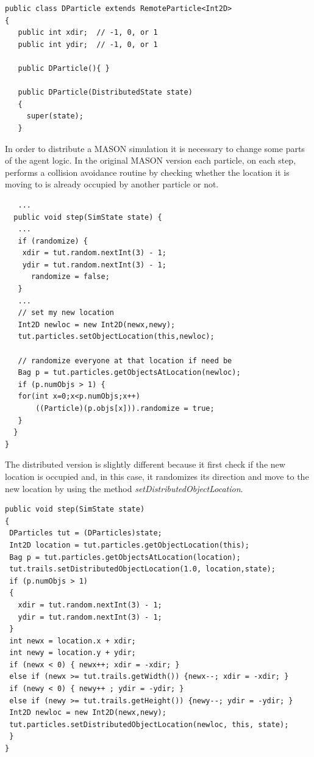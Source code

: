 \documentclass[12pt]{article}
\begin{document}
\begin{lstlisting}
public class DParticle extends RemoteParticle<Int2D>
{
   public int xdir;  // -1, 0, or 1
   public int ydir;  // -1, 0, or 1

   public DParticle(){ }
   
   public DParticle(DistributedState state)
   {
     super(state);
   }
\end{lstlisting}

In order to distribute a MASON simulation it is necessary to change some parts of the agent logic. In the original MASON version each particle, on each step, performs a collision avoidance routine by checking whether the location it is moving to is already occupied by another particle or not. 

\begin{lstlisting}
   ...
  public void step(SimState state) {
   ...
   if (randomize) {
    xdir = tut.random.nextInt(3) - 1;
    ydir = tut.random.nextInt(3) - 1;
	  randomize = false;
   }
   ...
   // set my new location
   Int2D newloc = new Int2D(newx,newy);
   tut.particles.setObjectLocation(this,newloc);
   
   // randomize everyone at that location if need be
   Bag p = tut.particles.getObjectsAtLocation(newloc);
   if (p.numObjs > 1) {
   for(int x=0;x<p.numObjs;x++)
       ((Particle)(p.objs[x])).randomize = true;
   }
  }
}
\end{lstlisting}

The distributed version is slightly different because it first check if the new location is occupied and, in this case, it randomizes its direction and move to the new location by using the method \textit{setDistributedObjectLocation}.


\begin{lstlisting}
public void step(SimState state)
{
 DParticles tut = (DParticles)state;
 Int2D location = tut.particles.getObjectLocation(this);
 Bag p = tut.particles.getObjectsAtLocation(location);
 tut.trails.setDistributedObjectLocation(1.0, location,state);
 if (p.numObjs > 1)
 {
   xdir = tut.random.nextInt(3) - 1; 
   ydir = tut.random.nextInt(3) - 1;
 }
 int newx = location.x + xdir;
 int newy = location.y + ydir;
 if (newx < 0) { newx++; xdir = -xdir; } 
 else if (newx >= tut.trails.getWidth()) {newx--; xdir = -xdir; }
 if (newy < 0) { newy++ ; ydir = -ydir; }
 else if (newy >= tut.trails.getHeight()) {newy--; ydir = -ydir; }
 Int2D newloc = new Int2D(newx,newy);
 tut.particles.setDistributedObjectLocation(newloc, this, state);
 }
}
\end{lstlisting}
\end{document}
